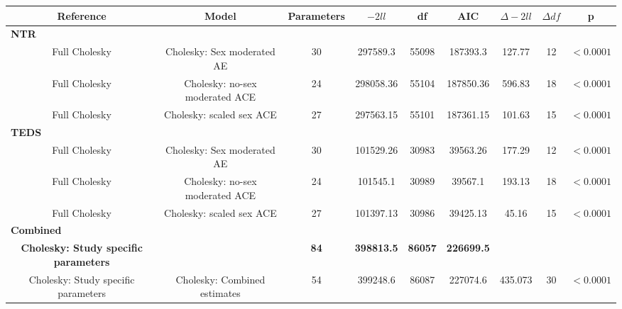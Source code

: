 \begin{tabular}{ccccccccc}
  \toprule
  \textbf{Reference} & \textbf{Model} & \textbf{Parameters} & \textbf{$-2ll$} & \textbf{df} & \textbf{AIC} & \textbf{$\Delta-2ll$} & \textbf{$\Delta df$} & \textbf{p} \\
  \midrule
  \multicolumn{9}{l}{\textbf{NTR}} \\
  Full Cholesky & Cholesky: Sex moderated AE & 30    & 297589.3 & 55098 & 187393.3 & 127.77 & 12    & $< 0.0001$ \\
  Full Cholesky & Cholesky: no-sex moderated ACE & 24    & 298058.36 & 55104 & 187850.36 & 596.83 & 18    & $< 0.0001$ \\
  Full Cholesky & Cholesky: scaled sex ACE & 27    & 297563.15 & 55101 & 187361.15 & 101.63 & 15    & $< 0.0001$ \\
  \multicolumn{9}{l}{\textbf{TEDS}} \\
  Full Cholesky & Cholesky: Sex moderated AE & 30    & 101529.26 & 30983 & 39563.26 & 177.29 & 12    & $< 0.0001$ \\
  Full Cholesky & Cholesky: no-sex moderated ACE & 24    & 101545.1 & 30989 & 39567.1 & 193.13 & 18    & $< 0.0001$ \\
  Full Cholesky & Cholesky: scaled sex ACE & 27    & 101397.13 & 30986 & 39425.13 & 45.16 & 15    & $< 0.0001$ \\
  \multicolumn{9}{l}{\textbf{Combined}} \\
  \textbf{Cholesky: Study specific parameters} &       & \textbf{84} & \textbf{398813.5} & \textbf{86057} & \textbf{226699.5} &       &       &  \\
  Cholesky: Study specific parameters & Cholesky: Combined estimates & 54    & 399248.6 & 86087 & 227074.6 & 435.073 & 30    & $< 0.0001$ \\
  \cmidrule{1-8}    
\end{tabular}%
